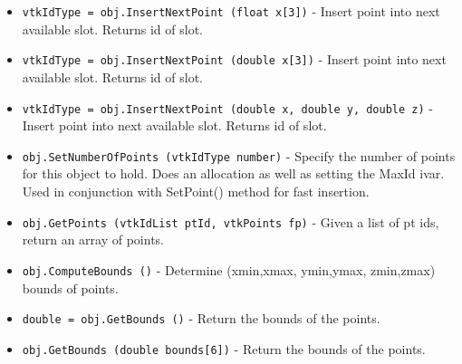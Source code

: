 \begin{itemize}
\item  \verb|vtkIdType = obj.InsertNextPoint (float x[3])| -  Insert point into next available slot. Returns id of slot.

\item  \verb|vtkIdType = obj.InsertNextPoint (double x[3])| -  Insert point into next available slot. Returns id of slot.

\item  \verb|vtkIdType = obj.InsertNextPoint (double x, double y, double z)| -  Insert point into next available slot. Returns id of slot.

\item  \verb|obj.SetNumberOfPoints (vtkIdType number)| -  Specify the number of points for this object to hold. Does an
 allocation as well as setting the MaxId ivar. Used in conjunction with
 SetPoint() method for fast insertion.

\item  \verb|obj.GetPoints (vtkIdList ptId, vtkPoints fp)| -  Given a list of pt ids, return an array of points.

\item  \verb|obj.ComputeBounds ()| -  Determine (xmin,xmax, ymin,ymax, zmin,zmax) bounds of points.

\item  \verb|double = obj.GetBounds ()| -  Return the bounds of the points.

\item  \verb|obj.GetBounds (double bounds[6])| -  Return the bounds of the points.

\end{itemize}
